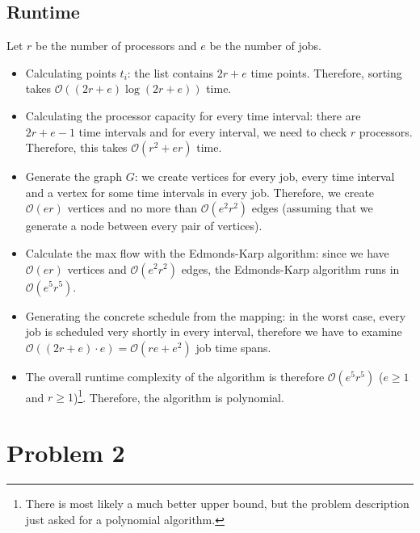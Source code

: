 \documentclass[12pt]{article}
\begin{document}
\subsection*{Runtime}
Let $r$ be the number of processors and $e$ be the number of jobs.

\begin{itemize}
	\item Calculating points $t_i$: the list contains $2r + e$ time points. Therefore, sorting takes $\mathcal{O}((2r+e) \log (2r + e))$ time.
	\item Calculating the processor capacity for every time interval: there are $2r+e-1$ time intervals and for every interval, we need to check $r$ processors. Therefore, this takes $\mathcal{O}(r^2 + er)$ time.
	\item Generate the graph $G$: we create vertices for every job, every time interval and a vertex for some time intervals in every job. Therefore, we create $\mathcal{O}(er)$ vertices and no more than $\mathcal{O}(e^2 r^2)$ edges (assuming that we generate a node between every pair of vertices).
	\item Calculate the max flow with the Edmonds-Karp algorithm: since we have $\mathcal{O}(er)$ vertices and $\mathcal{O}(e^2 r^2)$ edges, the Edmonds-Karp algorithm runs in $\mathcal{O}(e^5 r^5)$.
	\item Generating the concrete schedule from the mapping: in the worst case, every job is scheduled very shortly in every interval, therefore we have to examine $\mathcal{O}((2r + e) \cdot e) = \mathcal{O}(re + e^2)$ job time spans.
	\item The overall runtime complexity of the algorithm is therefore $\mathcal{O}(e^5 r^5)$ ($e \geq 1$ and $r \geq 1$)\footnote{There is most likely a much better upper bound, but the problem description just asked for a polynomial algorithm.}. Therefore, the algorithm is polynomial.
\end{itemize}

\section*{Problem 2}
\end{document}
